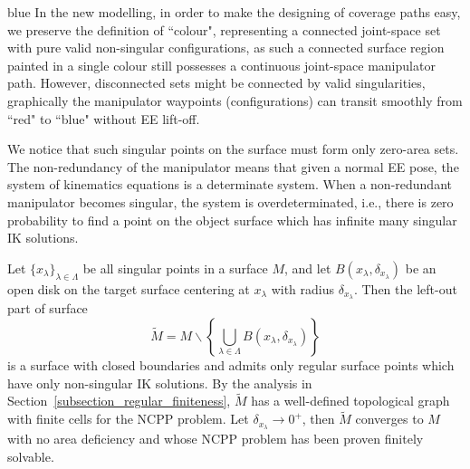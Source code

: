\documentclass[Afour,sageh,times]{sagej}
\begin{document}
\begin{color}{blue}
In the new modelling, in order to make the designing of coverage paths easy, we preserve the definition of ``colour", representing a connected joint-space set with pure valid non-singular configurations, as such a connected surface region painted in a single colour still possesses a continuous joint-space manipulator path. 
However, disconnected sets might be connected by valid singularities, graphically the manipulator waypoints (configurations) can transit smoothly from ``red" to ``blue" without EE lift-off. 

We notice that such singular points on the surface must form only zero-area sets. 
The non-redundancy of the manipulator means that given a normal EE pose, the system of kinematics equations is a determinate system. 
When a non-redundant manipulator becomes singular, the system is overdeterminated, i.e., there is zero probability to find a point on the object surface which has infinite many singular IK solutions. 

Let $\{x_{\lambda}\}_{\lambda\in\Lambda}$ be all singular points in a surface $M$, and let $B(x_{\lambda}, \delta_{x_{\lambda}})$ be an open disk on the target surface centering at $x_{\lambda}$ with radius $\delta_{x_{\lambda}}$. 
Then the left-out part of surface
\begin{equation}
\tilde{M} = M\backslash \left\{\bigcup\limits_{\lambda\in\Lambda}B(x_{\lambda}, \delta_{x_{\lambda}})\right\}
\end{equation}
is a surface with closed boundaries and admits only regular surface points which have only non-singular IK solutions. 
By the analysis in Section~\ref{subsection_regular_finiteness}, $\tilde{M}$ has a well-defined topological graph with finite cells for the NCPP problem.  
Let $\delta_{x_{\lambda}}\rightarrow 0^+$, then $\tilde{M}$ converges to $M$ with no area deficiency and whose NCPP problem has been proven finitely solvable. 


\end{color}
\end{document}
